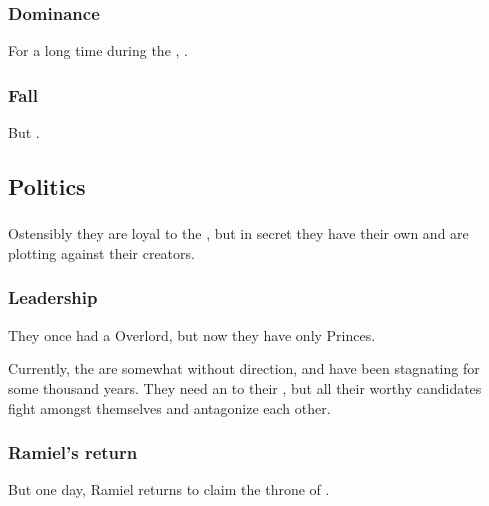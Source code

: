 \subsubsection{Dominance}
For a long time during the \resphanwars, . 





\subsubsection{Fall}
But . 









\subsection{Politics}





\subsubsection{\Banes}
Ostensibly they are loyal to the \SitraAchra, but in secret they have their own \matrixx{} and are plotting against their creators. 





\subsubsection{Leadership}
They once had a Overlord, but now they have only Princes.

Currently, the \Mystraacht{} are somewhat without direction, and have been stagnating for some thousand years. They need an \apex{} to their \matrixx, but all their worthy candidates fight amongst themselves and antagonize each other. 







\subsubsection{Ramiel's return}
But one day, Ramiel returns to claim the throne of \Mystraacht. 

